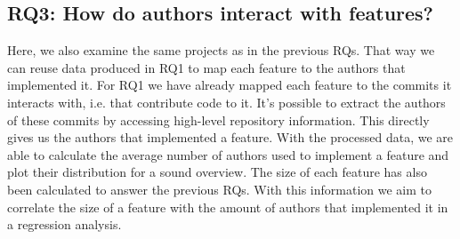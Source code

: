 \subsection*{\textbf{RQ3: How do authors interact with features?}}

Here, we also examine the same projects as in the previous RQs.
That way we can reuse data produced in RQ1 to map each feature to the authors that implemented it.
For RQ1 we have already mapped each feature to the commits it interacts with, i.e. that contribute code to it.
It's possible to extract the authors of these commits by accessing high-level repository information.
This directly gives us the authors that implemented a feature.
With the processed data, we are able to calculate the average number of authors used to implement a feature and plot their distribution for a sound overview.
The size of each feature has also been calculated to answer the previous RQs.
With this information we aim to correlate the size of a feature with the amount of authors that implemented it in a regression analysis.
